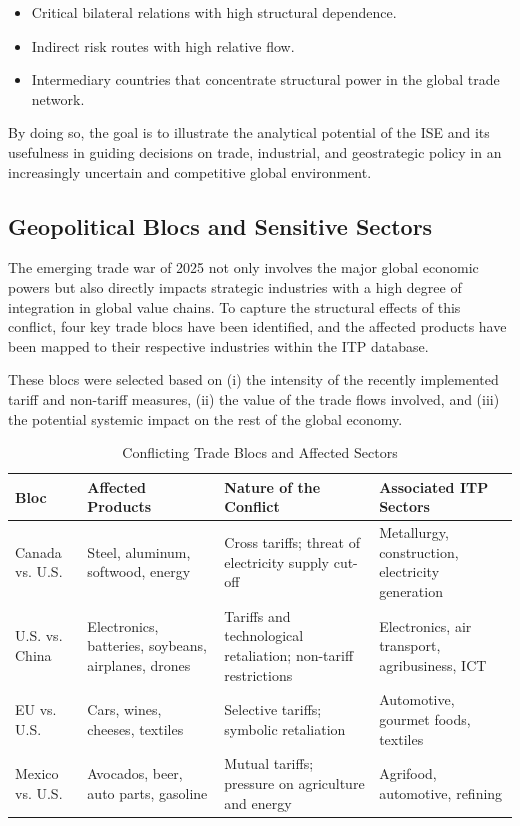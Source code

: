 \documentclass[final,1p,times,authoryear]{elsarticle}
\begin{document}
\begin{itemize}
    \item Critical bilateral relations with high structural dependence.
    \item Indirect risk routes with high relative flow.
    \item Intermediary countries that concentrate structural power in the global trade network.
\end{itemize}

By doing so, the goal is to illustrate the analytical potential of the ISE and its usefulness in guiding decisions on trade, industrial, and geostrategic policy in an increasingly uncertain and competitive global environment.

\subsection{Geopolitical Blocs and Sensitive Sectors}

The emerging trade war of 2025 not only involves the major global economic powers but also directly impacts strategic industries with a high degree of integration in global value chains. To capture the structural effects of this conflict, four key trade blocs have been identified, and the affected products have been mapped to their respective industries within the ITP database.

These blocs were selected based on (i) the intensity of the recently implemented tariff and non-tariff measures, (ii) the value of the trade flows involved, and (iii) the potential systemic impact on the rest of the global economy.

\begin{table}[t]
\centering
\caption{Conflicting Trade Blocs and Affected Sectors}
\label{tab:bloques_sector}
\begin{tabularx}{\textwidth}{@{}l X X X@{}}
    \toprule \textbf{Bloc} & \textbf{Affected Products} & \textbf{Nature of the Conflict} & \textbf{Associated ITP Sectors} \\
    \midrule
    Canada vs. U.S. & Steel, aluminum, softwood, energy & Cross tariffs; threat of electricity supply cut-off & Metallurgy, construction, electricity generation \\
    U.S. vs. China & Electronics, batteries, soybeans, airplanes, drones & Tariffs and technological retaliation; non-tariff restrictions & Electronics, air transport, agribusiness, ICT \\
    EU vs. U.S. & Cars, wines, cheeses, textiles & Selective tariffs; symbolic retaliation & Automotive, gourmet foods, textiles \\
    Mexico vs. U.S. & Avocados, beer, auto parts, gasoline & Mutual tariffs; pressure on agriculture and energy & Agrifood, automotive, refining \\
    \bottomrule
\end{tabularx}
\end{table}
\end{document}
